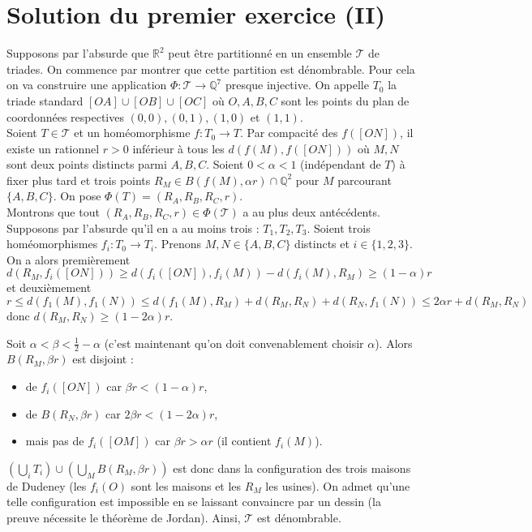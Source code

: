 \section{Solution du premier exercice (II)} %

Supposons par l'absurde que $\mathbb{R}^2 $ peut être partitionné en un ensemble $\mathcal{T}$ de triades. On commence par montrer que cette partition est dénombrable. Pour cela on va construire une application $\Phi  : \mathcal{T} \rightarrow \mathbb{Q}^7$ presque injective. On appelle $T_{0}$ la triade standard $[OA]\cup [OB]\cup [OC]$ où $O,A,B,C$ sont les points du plan de coordonnées respectives $(0,0),(0,1),(1,0)$ et $(1,1)$.\\

Soient $T\in \mathcal{T}$ et un homéomorphisme $f:T_{0} \rightarrow  T$. Par compacité des $f([ON])$, il existe un rationnel $r>0$ inférieur à tous les $d(f(M),f([ON]))$ où $M,N$ sont deux points distincts parmi $A,B,C$. Soient $0<\alpha <1$ (indépendant de $T$) à fixer plus tard et trois points $R_{M} \in  B(f(M),\alpha r)\cap \mathbb{Q}^2 $ pour $M$ parcourant $\{A,B,C\}$. On pose $\Phi (T) = (R_{A} ,R_{B} ,R_{C} ,r)$.\\

Montrons que tout $(R_{A} ,R_{B} ,R_{C} ,r )\in \Phi (\mathcal{T})$ a au plus deux antécédents. Supposons par l'absurde qu'il en a au moins trois : $T_{1} ,T_{2} ,T_{3}$. Soient trois homéomorphismes $f_{i} :T_{0} \rightarrow T_{i}$. Prenons $M,N\in \{A,B,C\}$ distincts et $i\in \{1,2,3\}$. On a alors premièrement
\[d(R_{M} ,f_{i} ([ON])) \geqslant  d(f_{i} ([ON]), f_{i} (M)) - d(f_{i} (M),R_{M} ) \geqslant  (1-\alpha )r\]
et deuxièmement
\[r\leqslant  d(f_{1} (M),f_{1} (N)) \leqslant  d(f_{1} (M ),R_{M} ) + d(R_{M} ,R_{N} ) + d(R_{N} ,f_{1} (N)) \leqslant  2\alpha r+d(R_{M} ,R_{N} ) \]
donc $d(R_{M} ,R_{N} ) \geqslant  (1-2\alpha )r$.

Soit $\alpha <\beta < \frac{1}{2} -\alpha $ (c'est maintenant qu'on doit convenablement choisir $\alpha $). Alors $B(R_{M} ,\beta r)$ est disjoint :
\begin{itemize}
	\item de $f_{i} ([ON])$ car $\beta r < (1-\alpha )r$,
	\item de $B(R_{N} ,\beta r)$ car $2\beta r <  (1-2\alpha )r$,
	\item mais pas de $f_{i} ([OM])$ car $\beta r>\alpha r$ (il contient $f_{i} (M)$).
\end{itemize}
$\left(\bigcup _{i} T_{i} \right) \cup \left( \bigcup _{M} B(R_{M} ,\beta r)\right)$ est donc dans la configuration des trois maisons de Dudeney (les $f_{i} (O)$ sont les maisons et les $R_{M}$ les usines). On admet qu'une telle configuration est impossible en se laissant convaincre par un dessin (la preuve nécessite le théorème de Jordan). Ainsi, $\mathcal{T}$ est dénombrable.\\

